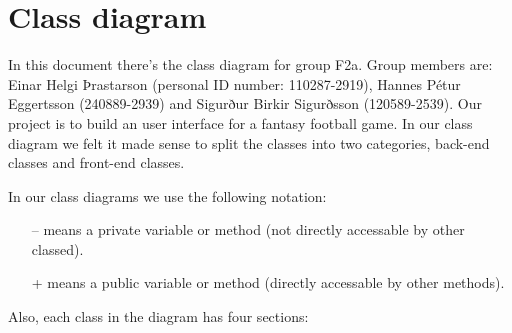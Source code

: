 \documentclass{article}
\begin{document}
\section{Class diagram}
In this document there's the class diagram for group F2a. Group members are: Einar Helgi Þrastarson (personal ID number: 110287-2919), Hannes Pétur Eggertsson (240889-2939) and Sigurður Birkir Sigurðsson (120589-2539). Our project is to build an user interface for a fantasy football game. In our class diagram we felt it made sense to split the classes into two categories, back-end classes and front-end classes.

In our class diagrams we use the following notation:\vspace*{-0.5cm}
\begin{itemize}\itemsep-4pt
\item[--] means a private variable or method (not directly accessable by other classed).
\item[+] means a public variable or method (directly accessable by other methods).
\end{itemize}


Also, each class in the diagram has four sections:
\begin{center}


\end{center}
\end{document}
